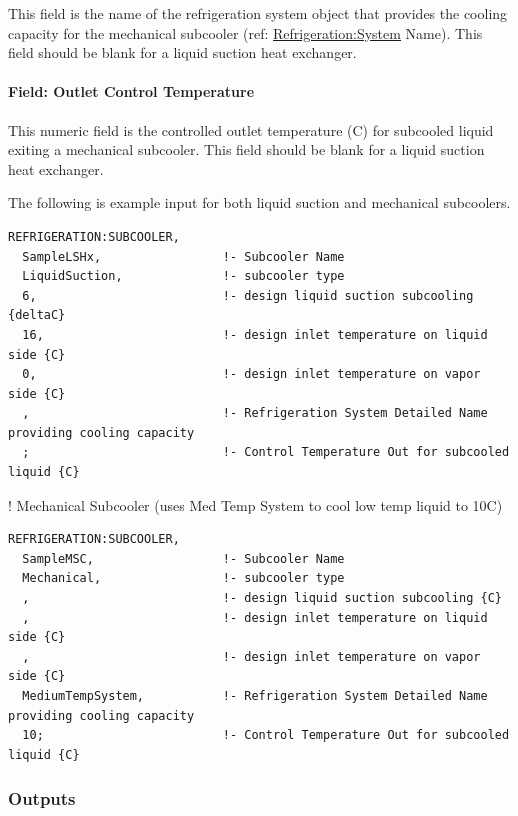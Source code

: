 This field is the name of the refrigeration system object that provides the cooling capacity for the mechanical subcooler (ref: \hyperref[refrigerationsystem]{Refrigeration:System} Name). This field should be blank for a liquid suction heat exchanger.

\paragraph{Field: Outlet Control Temperature}\label{field-outlet-control-temperature}

This numeric field is the controlled outlet temperature (C) for subcooled liquid exiting a mechanical subcooler. This field should be blank for a liquid suction heat exchanger.

The following is example input for both liquid suction and mechanical subcoolers.

\begin{lstlisting}
REFRIGERATION:SUBCOOLER,
  SampleLSHx,                 !- Subcooler Name
  LiquidSuction,              !- subcooler type
  6,                          !- design liquid suction subcooling {deltaC}
  16,                         !- design inlet temperature on liquid side {C}
  0,                          !- design inlet temperature on vapor side {C}
  ,                           !- Refrigeration System Detailed Name providing cooling capacity
  ;                           !- Control Temperature Out for subcooled liquid {C}
\end{lstlisting}

! Mechanical Subcooler (uses Med Temp System to cool low temp liquid to 10C)

\begin{lstlisting}
REFRIGERATION:SUBCOOLER,
  SampleMSC,                  !- Subcooler Name
  Mechanical,                 !- subcooler type
  ,                           !- design liquid suction subcooling {C}
  ,                           !- design inlet temperature on liquid side {C}
  ,                           !- design inlet temperature on vapor side {C}
  MediumTempSystem,           !- Refrigeration System Detailed Name providing cooling capacity
  10;                         !- Control Temperature Out for subcooled liquid {C}
\end{lstlisting}

\subsubsection{Outputs}\label{outputs-5-008}

